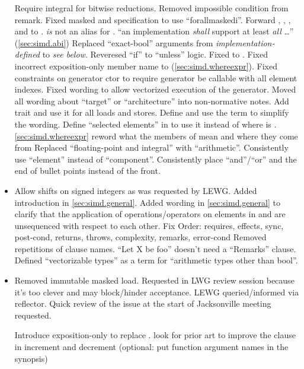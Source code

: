 \begin{itemize}
  \chck Require integral  for bitwise reductions.
  \chck Removed impossible condition from  remark.
  \chck Fixed masked  and  specification to use “forallmaskedi”.
  \chck Forward , , , and  to .
  \chck {} \emph{is} not an alias for .
  \chck “an implementation \emph{shall} support at least \emph{all} \ldots” (\ref{sec:simd.abi})
  \chck Replaced “exact-bool” arguments from \emph{implementation-defined} to \emph{see below}.
  \chck Reveresed “if” to “unless” logic.
  \chck Fixed  to .
  \chck Fixed incorrect  exposition-only member name to  (\ref{sec:simd.whereexpr}).
  \chck Fixed constraints on generator ctor to require generator be callable with all element indexes.
  \chck Fixed wording to allow vectorized execution of the generator.
  \chck Moved all wording about “target” or “architecture” into non-normative notes.
  \chck Add  trait and use it for all loads and stores.
  \chck Define and use the term \emph{\realArithmeticType} to simplify the wording.
  \chck Define “selected elements” in  to use it instead of  where  is \true.
  \chck \ref{sec:simd.whereexpr} reword what the members of  mean and where they come from
  \chck Replaced “floating-point and integral” with “arithmetic”.
  \chck Consistently use “element” instead of “component”.
  \chck Consistently place “and”/“or” and the end of bullet points instead of the front.
  \item Allow shifts on signed integers as was requested by LEWG.
  \chck Added introduction in \ref{sec:simd.general}.
  \chck Added wording in \ref{sec:simd.general} to clarify that the application of operations/operators on elements in \simd and \mask are unsequenced with respect to each other.
  \chck Fix Order: requires, effects, sync, post-cond, returns, throws, complexity, remarks, error-cond
  \chck Removed repetitions of clause names.
  \chck “Let X be foo” doesn't need a “Remarks” clause.
  \chck Defined “vectorizable types” as a term for “arithmetic types other than bool”.
  \item Removed immutable masked load.
    Requested in LWG review session because it's too clever and may block/hinder acceptance.
    LEWG queried/informed via reflector.
    Quick review of the issue at the start of Jacksonville meeting requested.

  \todo Introduce exposition-only  to replace .
  \todo look for prior art to improve the \returns clause in increment and decrement
  \todo (optional: put function argument names in the synopsis)
\end{itemize}

